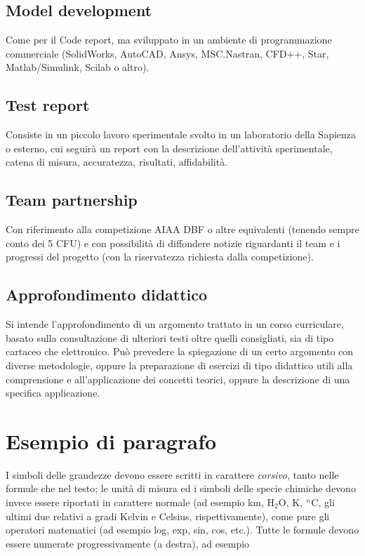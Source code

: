 \documentclass{baer}
\begin{document}
\subsection{Model development}
Come per il Code report, ma sviluppato in un ambiente di
programmazione commerciale (SolidWorks, AutoCAD,
Ansys, MSC.Nastran, CFD++, Star, Matlab/Simulink,
Scilab o altro).

\subsection{Test report}
Consiste in un piccolo lavoro sperimentale svolto in un
laboratorio della Sapienza o esterno, cui seguirà un
report con la descrizione dell’attività sperimentale, catena
di misura, accuratezza, risultati, affidabilità.

\subsection{Team partnership}
Con riferimento alla competizione AIAA DBF o altre
equivalenti (tenendo sempre conto dei 5 CFU) e con
possibilità di diffondere notizie riguardanti il team e i
progressi del progetto (con la riservatezza richiesta dalla
competizione).

\subsection{Approfondimento didattico}
Si intende l’approfondimento di un argomento trattato in
un corso curriculare, basato sulla consultazione di
ulteriori testi oltre quelli consigliati, sia di tipo cartaceo
che elettronico. Può prevedere la spiegazione di un certo
argomento con diverse metodologie, oppure la
preparazione di esercizi di tipo didattico utili alla
comprensione e all’applicazione dei concetti teorici,
oppure la descrizione di una specifica applicazione.

\section{Esempio di paragrafo}

I simboli delle grandezze devono essere scritti in carattere \textit{corsivo}, tanto nelle formule che nel testo; le unità di misura ed i simboli delle specie chimiche devono invece essere riportati in carattere normale (ad esempio km, H$_2$O, K, $^{\rm o}$C, gli ultimi due relativi a gradi Kelvin e Celsius, rispettivamente), come pure gli operatori matematici (ad esempio log, exp, sin, cos, etc.). Tutte le formule devono essere numerate progressivamente (a destra), ad esempio
\end{document}
